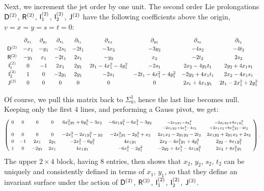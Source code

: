 \documentclass[12pt,twoside,leqno,openany]{amsart}
\begin{document}
Next, we increment the jet order by one unit.
The second order Lie prolongations
${\sf D}^{(2)}$, ${\sf R}^{(2)}$, ${\sf I}_1^{(2)}$, 
${\sf I}_2^{(2)}$, ${\sf J}^{(2)}$
have the following coefficients above the origin, 
$v = x = y = s = t = 0$:
\[
\def\arraystretch{1.25}
\begin{array}{ccccccccc}
& \partial_{x_1} & \partial_{y_1} & \partial_{s_1} & \partial_{t_1}
& \partial_{x_2} & \partial_{y_2} & \partial_{s_2} & \partial_{t_2}
\\
{\sf D}^{(2)} & -x_1 & -y_1 & -2s_1 & -2t_1 &
-3x_2 & -3y_2 & -4s_2 & -4t_2
\\
{\sf R}^{(2)} & -y_1 & x_1 & -2t_1 & 2s_1 &
-y_2 & x_2 & -2t_2 & 2s_2
\\
{\sf I}_1^{(2)} & 0 & -1 & 2x_1 & 2y_1 &
2t_1-4x_1^2-4y_1^2 & -2s_1 & 2x_2-4y_1t_1 & 2y_2+4x_1s_1
\\
{\sf I}_2^{(2)} & 1 & 0 & -2y_1 & 2y_1 &
-2s_1 & -2t_1-4x_1^2-4y_1^2 & -2y_2+4x_1t_1 & 2x_2-4x_1s_1
\\
{\sf J}^{(2)} & 0 & 0 & 0 & 0 &
0 & 0 & 2s_1+4x_1y_1 & 2t_1-2x_1^2+2y_1^2
\end{array}
\]

Of course, we pull this matrix back to $\Sigma_0^1$,
hence the last line becomes null. Keeping only the
first $4$ lines, and performing a Gauss pivot, we get:
\[
\footnotesize
\aligned
\left(\!
\def\arraystretch{1.25}
\begin{array}{ccccccccc}
0 & 0 & 0 & 0 &
6x_1^2y_1+6y_1^3-3x_2 & -6x_1y_1^2-6x_1^3-3y_2 &
\underset{-2x_1y_2+4x_1^4-4s_2}{{\scriptstyle{-2x_2y_1-4y_1^4}}} & 
\underset{+2x_1x_2+8x_1^3y_1-4t_2}{{\scriptstyle{-2y_1y_2+8x_1y_1^3}}}
\\
0 & 0 & 0 & 0 &
-2x_1^3-2x_1y_1^2-y_2 & -2x_1^2y_1-2y_1^3+x_2 &
2x_1x_2-2y_1y_2-2t_2 & 2x_1y_2+2y_1x_2+2s_2
\\
0 & -1 & 2x_1 & 2y_1 & 
-2x_1^2-6y_1^2 & 4x_1y_1 & 2x_2-4x_1^2y_1+4y_1^3 &
2y_2-8x_1y_1^2
\\
1 & 0 & -2y_1 & 2x_1 & 4x_1y_1 & -6x_1^2-2y_1^2 &
-2y_2+4x_1^3-4x_1y_1^2 & 2x_2+8x_1^2y_1
\end{array}
\!\right).
\endaligned
\]
The upper $2 \times 4$ block, having $8$ entries,
then shows that $x_2$, $y_2$, $s_2$, $t_2$ can be 
uniquely and consistently defined in terms of $x_1$, $y_1$,
so that they define an invariant surface under the action of
${\sf D}^{(2)}$, ${\sf R}^{(2)}$, ${\sf I}_1^{(2)}$,
${\sf I}_2^{(2)}$, ${\sf J}^{(2)}$.

\begin{center}

\end{center}
\end{document}
